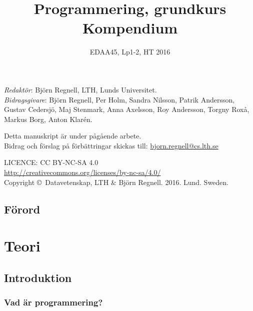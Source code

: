 \documentclass[a4paper]{compendium}
\title{
{\bf\Huge\sffamily  Programmering, grundkurs} 
\\ \vspace{2em}
{\sffamily  Kompendium}
}
\date{EDAA45, Lp1-2, HT 2016}
\begin{document}
\maketitle

\clearpage\null\thispagestyle{empty}
\vskip15cm

{\setlength{\parindent}{0pt}
\emph{Redaktör}: Björn Regnell, LTH, Lunds Universitet. \\ 

\emph{Bidragsgivare}: 
Björn Regnell,
Per Holm,
Sandra Nilsson,
Patrik Andersson,
Gustav Cedersjö,
Maj Stenmark,
Anna Axelsson,
Roy Andersson,
Torgny Roxå,
Markus Borg,
Anton Klarén.
\\ \newline

Detta manuskript är under pågående arbete. \\
Bidrag och förslag på förbättringar skickas till: 
\url{bjorn.regnell@cs.lth.se}
\\ \newline

LICENCE: CC BY-NC-SA 4.0 \\
\url{http://creativecommons.org/licenses/by-nc-sa/4.0/}
\\ \newline
Copyright \copyright~Datavetenskap, LTH \& Björn Regnell. 2016. Lund. Sweden.\\

}

\tableofcontents

\chapter*{Förord} 

\lipsum[1-3]

\mainmatter

\part{Teori} 

\chapter{Introduktion}

\section{Vad är programmering?}
\end{document}
